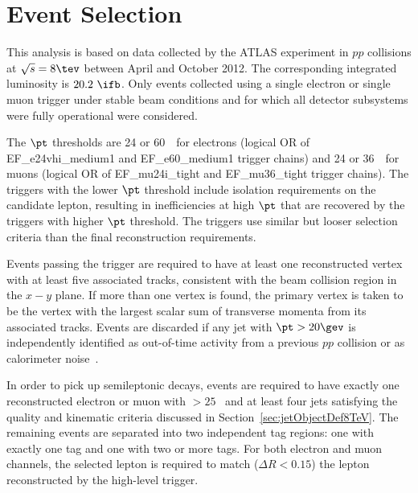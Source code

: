 \section{Event Selection}
\label{sec:eventPreselection}
This analysis is based on data collected by the ATLAS experiment in
$pp$ collisions at $\sqrt{s}=8\tev$
between April and October 2012. The corresponding integrated
luminosity is $20.2~\ifb$.
Only events collected using
a single electron or single muon trigger under stable beam conditions and for which
all detector subsystems were fully operational were considered.

The $\pt$ thresholds are 24 or 60~\gev\ for
electrons (logical OR of EF\_e24vhi\_medium1 and EF\_e60\_medium1 trigger chains) and 24 or 36~\gev\ 
for muons (logical OR of EF\_mu24i\_tight and EF\_mu36\_tight trigger chains).  
The triggers with the lower $\pt$ threshold include isolation requirements on the candidate lepton, 
resulting in inefficiencies at high $\pt$
that are recovered by the triggers with higher $\pt$ threshold.
The triggers use similar but looser selection criteria than the final reconstruction
requirements.

Events passing the trigger are required to have at least one reconstructed vertex with at least five associated tracks, consistent with the beam collision region in the $x-y$ plane. If more than one vertex is found, the primary vertex is taken to be the vertex with the largest scalar sum of transverse momenta from its associated tracks. Events are discarded if any jet with $\pt > 20\gev$ is independently identified as out-of-time activity from a previous $pp$ collision or as calorimeter noise~\cite{ref:ATLAS-CONF-2012-020}.

In order to pick up semileptonic \ttbar decays, events are required to have exactly one
reconstructed electron or muon with \pt$>25$ \gev\ and at least four jets satisfying the
quality and kinematic criteria discussed in Section~\ref{sec:jetObjectDef8TeV}. The remaining events are separated into two independent \bt tag regions: one with exactly one \bt tag and one with two or more \bt tags. For both electron and muon channels, the selected lepton is required to match ($\Delta R < 0.15$) the lepton reconstructed by the high-level trigger.

